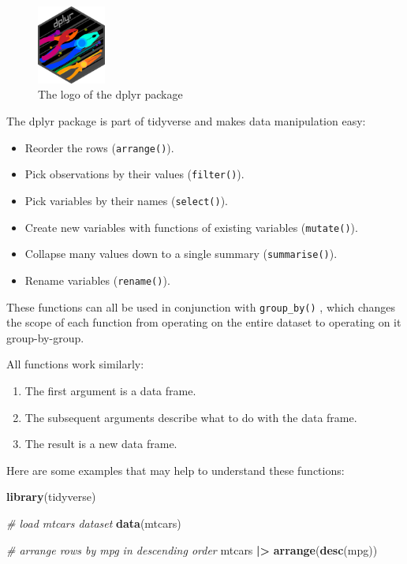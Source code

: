\documentclass[
  12pt,
  oneside]{book}
\newenvironment{Shaded}{\begin{snugshade}}{\end{snugshade}}
\newcommand{\CommentTok}[1]{\textcolor[rgb]{0.56,0.35,0.01}{\textit{#1}}}
\newcommand{\FunctionTok}[1]{\textcolor[rgb]{0.13,0.29,0.53}{\textbf{#1}}}
\newcommand{\NormalTok}[1]{#1}
\newcommand{\SpecialCharTok}[1]{\textcolor[rgb]{0.81,0.36,0.00}{\textbf{#1}}}
\providecommand{\tightlist}{%
  \setlength{\itemsep}{0pt}\setlength{\parskip}{0pt}}
\theoremstyle{definition}
\theoremstyle{definition}
\theoremstyle{definition}
\theoremstyle{definition}
\theoremstyle{remark}
\begin{document}
\begin{figure}
\centering
\includegraphics[width=0.2\textwidth,height=\textheight]{fig/dplyr-logo.png}
\caption{\label{fig:dplyr-logo} The logo of the dplyr package}
\end{figure}

The dplyr package is part of tidyverse and makes data manipulation easy:

\begin{itemize}
\tightlist
\item
  Reorder the rows (\texttt{arrange()}).
\item
  Pick observations by their values (\texttt{filter()}).
\item
  Pick variables by their names (\texttt{select()}).
\item
  Create new variables with functions of existing variables
  (\texttt{mutate()}).
\item
  Collapse many values down to a single summary (\texttt{summarise()}).
\item
  Rename variables (\texttt{rename()}).
\end{itemize}

These functions can all be used in conjunction with \texttt{group\_by()} , which changes the scope of each function from operating on the entire dataset to operating on it group-by-group.

All functions work similarly:

\begin{enumerate}
\def\labelenumi{\arabic{enumi}.}
\tightlist
\item
  The first argument is a data frame.
\item
  The subsequent arguments describe what to do with the data frame.
\item
  The result is a new data frame.
\end{enumerate}

Here are some examples that may help to understand these functions:

\begin{Shaded}
\begin{Highlighting}[]
\FunctionTok{library}\NormalTok{(tidyverse)}

\CommentTok{\# load mtcars dataset}
\FunctionTok{data}\NormalTok{(mtcars)}

\CommentTok{\# arrange rows by mpg in descending order}
\NormalTok{mtcars }\SpecialCharTok{|\textgreater{}} 
  \FunctionTok{arrange}\NormalTok{(}\FunctionTok{desc}\NormalTok{(mpg))}
\end{Highlighting}
\end{Shaded}
\end{document}
